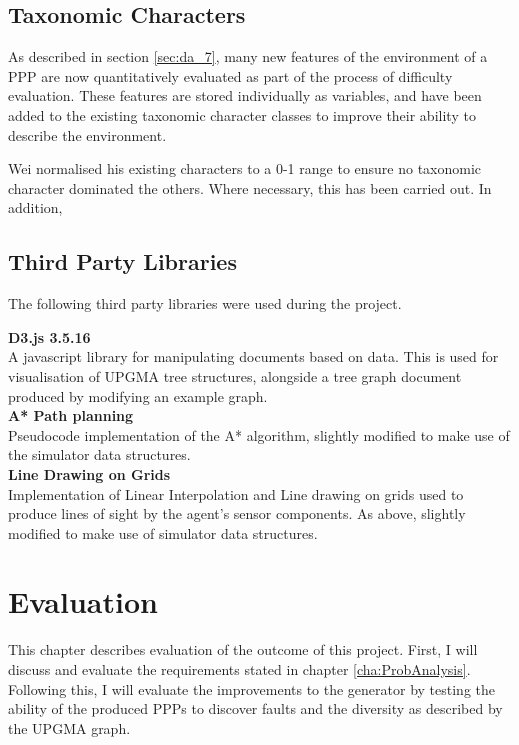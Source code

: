 \documentclass[authoryearcitations]{UoYCSproject}
\begin{document}
\section{Taxonomic Characters}
\label{sec:taxchar_design}
As described in section \ref{sec:da_7}, many new features of the environment of a PPP are now quantitatively evaluated as part of the process of difficulty evaluation. These features are stored individually as variables, and have been added to the existing taxonomic character classes to improve their ability to describe the environment.

Wei normalised his existing characters to a 0-1 range to ensure no taxonomic character dominated the others. Where necessary, this has been carried out. In addition, 

\section{Third Party Libraries}
\label{sec:tplibs}
The following third party libraries were used during the project.

\textbf{D3.js 3.5.16 \cite{d3js}}\\
A javascript library for manipulating documents based on data. This is used for visualisation of UPGMA tree structures, alongside a tree graph document produced by modifying an example graph.\\

\textbf{A* Path planning \cite{aStar}}\\
Pseudocode implementation of the A* algorithm, slightly modified to make use of the simulator data structures.\\

\textbf{Line Drawing on Grids \cite{lineDrawing}}\\
Implementation of Linear Interpolation and Line drawing on grids used to produce lines of sight by the agent's sensor components. As above, slightly modified to make use of simulator data structures.\\

\chapter{Evaluation}
\label{cha:Evaluation}
This chapter describes evaluation of the outcome of this project. First, I will discuss and evaluate the requirements stated in chapter \ref{cha:ProbAnalysis}. Following this, I will evaluate the improvements to the generator by testing the ability of the produced PPPs to discover faults and the diversity as described by the UPGMA graph.
\end{document}
